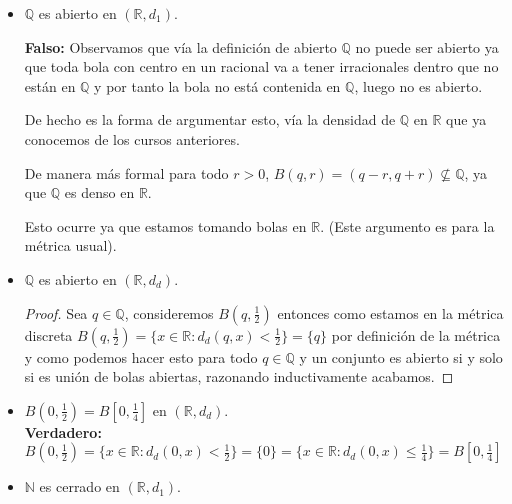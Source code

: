 \begin{itemize}[leftmargin=*]
\item  $\mathbb{Q}$ es abierto en $\left(\mathbb{R}, d_1\right)$.

\textbf{Falso: }Observamos que vía la definición de abierto $\mathbb{Q}$ no puede ser abierto ya que toda bola con centro en un racional va a tener irracionales dentro que no están en $\mathbb{Q}$ y por tanto la bola no está contenida en $\mathbb{Q}$, luego no es abierto.

De hecho es la forma de argumentar esto, vía la densidad de $\mathbb{Q}$ en $\mathbb{R}$ que ya conocemos de los cursos anteriores.

De manera más formal para todo $r>0$, $B(q,r)=(q-r,q+r) \not \subseteq \mathbb{Q}$, ya que $\mathbb{Q}$ es denso en $\mathbb{R}$.

Esto ocurre ya que estamos tomando bolas en $\mathbb{R}$. (Este argumento es para la métrica usual).

\item  $\mathbb{Q}$ es abierto en $\left(\mathbb{R}, d_d\right)$.\\

\begin{proof}
    Sea $q \in \mathbb{Q}$, consideremos $B(q,\frac{1}{2})$ entonces como estamos en la métrica discreta $B(q,\frac{1}{2})=\{x\in \mathbb{R}:d_d(q,x)<\frac{1}{2}\}=\{q\}$ por definición de la métrica y como podemos hacer esto para todo $q\in \mathbb{Q}$ y un conjunto es abierto si y solo si es unión de bolas abiertas, razonando inductivamente acabamos.
\end{proof}


\item $B\left(0, \frac{1}{2}\right)=B\left[0, \frac{1}{4}\right]$ en $\left(\mathbb{R}, d_d\right)$.\\

\textbf{Verdadero: }$B(0,\frac{1}{2})=\{x\in \mathbb{R} : d_d(0,x)<\frac{1}{2}\}=\{0\}=\{x \in \mathbb{R} : d_d(0,x)\leq \frac{1}{4}\}=B[0,\frac{1}{4}]$

\item $\mathbb{N}$ es cerrado en $\left(\mathbb{R}, d_1\right)$.\\

\begin{tikznt}
\centering
{}
\end{tikznt}
\end{itemize}
